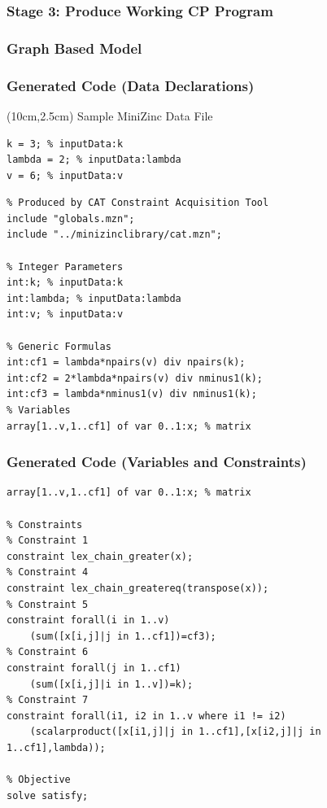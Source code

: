 \begin{frame}
\frametitle{Stage 3: Produce Working CP Program}
\scalebox{0.75}{

}
\end{frame}

\begin{frame}[fragile]
\frametitle{Graph Based Model}

\end{frame}


\begin{frame}[fragile]
\frametitle{Generated Code (Data Declarations)}
\begin{textblock*}{6cm}(10cm,2.5cm)
Sample MiniZinc Data File
\begin{lstlisting}[language=Mzn]
% Data for problem type12 instance 0
k = 3; % inputData:k
lambda = 2; % inputData:lambda
v = 6; % inputData:v
\end{lstlisting}
\end{textblock*}
\begin{lstlisting}[language=Mzn]
% Generated Constraint Model for Problem type12
% Produced by CAT Constraint Acquisition Tool
include "globals.mzn";
include "../minizinclibrary/cat.mzn";

% Integer Parameters
int:k; % inputData:k
int:lambda; % inputData:lambda
int:v; % inputData:v

% Generic Formulas
int:cf1 = lambda*npairs(v) div npairs(k);
int:cf2 = 2*lambda*npairs(v) div nminus1(k);
int:cf3 = lambda*nminus1(v) div nminus1(k);
% Variables
array[1..v,1..cf1] of var 0..1:x; % matrix
\end{lstlisting}
\end{frame}

\begin{frame}[fragile]
\frametitle{Generated Code (Variables and Constraints)}
\begin{lstlisting}[language=Mzn]
% Variables
array[1..v,1..cf1] of var 0..1:x; % matrix

% Constraints
% Constraint 1
constraint lex_chain_greater(x);
% Constraint 4
constraint lex_chain_greatereq(transpose(x));
% Constraint 5
constraint forall(i in 1..v)
	(sum([x[i,j]|j in 1..cf1])=cf3);
% Constraint 6
constraint forall(j in 1..cf1)
	(sum([x[i,j]|i in 1..v])=k);
% Constraint 7
constraint forall(i1, i2 in 1..v where i1 != i2)
	(scalarproduct([x[i1,j]|j in 1..cf1],[x[i2,j]|j in 1..cf1],lambda));

% Objective
solve satisfy;
\end{lstlisting}
\end{frame}

